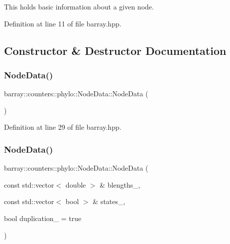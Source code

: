 This holds basic information about a given node. 

Definition at line 11 of file barray.\+hpp.



\subsection{Constructor \& Destructor Documentation}
\mbox{\label{classbarray_1_1counters_1_1phylo_1_1_node_data_a6c7c4ec30af2f9709fcc0b812c6f7202}} 
\subsubsection{\texorpdfstring{Node\+Data()}{NodeData()}\hspace{0.1cm}{\footnotesize\ttfamily [1/2]}}
{\footnotesize\ttfamily barray\+::counters\+::phylo\+::\+Node\+Data\+::\+Node\+Data (\begin{DoxyParamCaption}{ }\end{DoxyParamCaption})\hspace{0.3cm}{\ttfamily [inline]}}



Definition at line 29 of file barray.\+hpp.

\mbox{\label{classbarray_1_1counters_1_1phylo_1_1_node_data_adc8f549876bd90eff47537aa5bf8d65e}} 
\subsubsection{\texorpdfstring{Node\+Data()}{NodeData()}\hspace{0.1cm}{\footnotesize\ttfamily [2/2]}}
{\footnotesize\ttfamily barray\+::counters\+::phylo\+::\+Node\+Data\+::\+Node\+Data (\begin{DoxyParamCaption}\item[{const std\+::vector$<$ double $>$ \&}]{blengths\+\_\+,  }\item[{const std\+::vector$<$ bool $>$ \&}]{states\+\_\+,  }\item[{bool}]{duplication\+\_\+ = {\ttfamily true} }\end{DoxyParamCaption})\hspace{0.3cm}{\ttfamily [inline]}}



